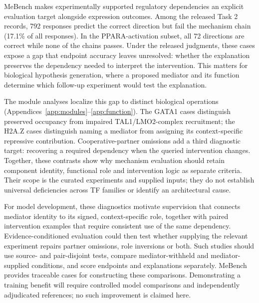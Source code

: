 MeBench makes experimentally supported regulatory dependencies an explicit evaluation target alongside expression outcomes. Among the released Task 2 records, 792 responses predict the correct direction but fail the mechanism chain (17.1\% of all responses). In the PPARA-activation subset, all 72 directions are correct while none of the chains passes. Under the released judgments, these cases expose a gap that endpoint accuracy leaves unresolved: whether the explanation preserves the dependency needed to interpret the intervention. This matters for biological hypothesis generation, where a proposed mediator and its function determine which follow-up experiment would test the explanation.

The module analyses localize this gap to distinct biological operations (Appendices~\ref{app:modules}--\ref{app:function}). The GATA1 cases distinguish preserved occupancy from impaired TAL1/LMO2-complex recruitment; the H2A.Z cases distinguish naming a mediator from assigning its context-specific repressive contribution. Cooperative-partner omissions add a third diagnostic target: recovering a required dependency when the queried intervention changes. Together, these contrasts show why mechanism evaluation should retain component identity, functional role and intervention logic as separate criteria. Their scope is the curated experiments and supplied inputs; they do not establish universal deficiencies across TF families or identify an architectural cause.

For model development, these diagnostics motivate supervision that connects mediator identity to its signed, context-specific role, together with paired intervention examples that require consistent use of the same dependency. Evidence-conditioned evaluation could then test whether supplying the relevant experiment repairs partner omissions, role inversions or both. Such studies should use source- and pair-disjoint tests, compare mediator-withheld and mediator-supplied conditions, and score endpoints and explanations separately. MeBench provides traceable cases for constructing these comparisons. Demonstrating a training benefit will require controlled model comparisons and independently adjudicated references; no such improvement is claimed here.
